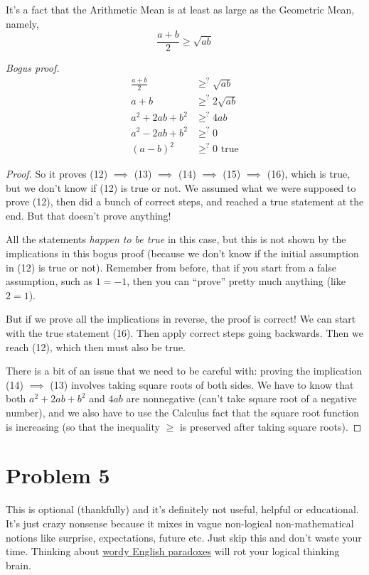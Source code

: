 \documentclass[14pt]{extarticle}
\begin{document}
It’s a fact that the Arithmetic Mean is at least as large as the Geometric Mean, namely,
$$
\frac{a+b}{2} \geq \sqrt{ab}
$$

{\it Bogus proof.}
\begin{align}
\frac{a+b}{2} &\geq^?\sqrt{ab}  \\
a+b &\geq^? 2\sqrt{ab} \\
a^2+2ab+b^2 &\geq^? 4ab\\
a^2-2ab+b^2 &\geq^? 0\\
(a-b)^2 &\geq^? 0 \text{ true}
\end{align}

\begin{proof}
So it proves (12) $ \implies $ (13) $ \implies $ (14) $ \implies $ (15) $ \implies $ (16), which is true, but we don't know if (12) is true or not. We assumed what we were supposed to prove (12), then did a bunch of correct steps, and reached a true statement at the end. But that doesn't prove anything! 

All the statements \textit{happen to be true} in this case, but this is not shown by the implications in this bogus proof (because we don't know if the initial assumption in (12) is true or not). Remember from before, that if you start from a false assumption, such as $1 = -1$, then you can ``prove'' pretty much anything (like $2 = 1$).

But if we prove all the implications in reverse, the proof is correct! We can start with the true statement (16). Then apply correct steps going backwards. Then we reach (12), which then must also be true.

There is a bit of an issue that we need to be careful with: proving the implication (14) $\implies$ (13) involves taking square roots of both sides. We have to know that both $a^2 + 2ab + b^2$ and $4ab$ are nonnegative (can't take square root of a negative number), and we also have to use the Calculus fact that the square root function is increasing (so that the inequality $\geq$ is preserved after taking square roots).
\end{proof}

\section{Problem 5}
This is optional (thankfully) and it's definitely not useful, helpful or educational. It's just crazy nonsense because it mixes in vague non-logical non-mathematical notions like surprise, expectations, future etc. Just skip this and don't waste your time. Thinking about \href{https://en.wikipedia.org/wiki/Unexpected_hanging_paradox}{wordy English paradoxes} will rot your logical thinking brain. 
\end{document}
